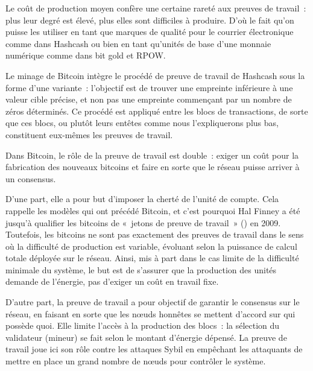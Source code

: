 Le coût de production moyen confère une certaine rareté aux preuves de travail~: plus leur degré est élevé, plus elles sont difficiles à produire. D'où le fait qu'on puisse les utiliser en tant que marques de qualité pour le courrier électronique comme dans Hashcash ou bien en tant qu'unités de base d'une monnaie numérique comme dans bit gold et RPOW.


Le minage de Bitcoin intègre le procédé de preuve de travail de Hashcash sous la forme d'une variante~: l'objectif est de trouver une empreinte inférieure à une valeur cible précise, et non pas une empreinte commençant par un nombre de zéros déterminés. Ce procédé est appliqué entre les blocs de transactions, de sorte que ces blocs, ou plutôt leurs entêtes comme nous l'expliquerons plus bas, constituent eux-mêmes les preuves de travail.

Dans Bitcoin, le rôle de la preuve de travail est double~: exiger un coût pour la fabrication des nouveaux bitcoins et faire en sorte que le réseau puisse arriver à un consensus.

D'une part, elle a pour but d'imposer la cherté de l'unité de compte. Cela rappelle les modèles qui ont précédé Bitcoin, et c'est pourquoi Hal Finney a été jusqu'à qualifier les bitcoins de «~jetons de preuve de travail~» () en 2009. Toutefois, les bitcoins ne sont pas exactement des preuves de travail dans le sens où la difficulté de production est variable, évoluant selon la puissance de calcul totale déployée sur le réseau. Ainsi, mis à part dans le cas limite de la difficulté minimale du système, le but est de s'assurer que la production des unités demande de l'énergie, pas d'exiger un coût en travail fixe.

D'autre part, la preuve de travail a pour objectif de garantir le consensus sur le réseau, en faisant en sorte que les nœuds honnêtes se mettent d'accord sur qui possède quoi. Elle limite l'accès à la production des blocs~: la sélection du validateur (mineur) se fait selon le montant d'énergie dépensé. La preuve de travail joue ici son rôle contre les attaques Sybil en empêchant les attaquants de mettre en place un grand nombre de nœuds pour contrôler le système.

